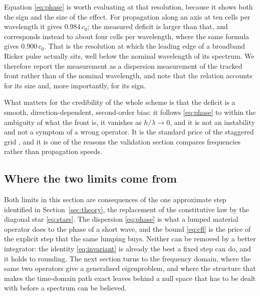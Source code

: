 Equation \eqref{eq:phase} is worth evaluating at that resolution, because it shows both the sign and the size of
the effect. For propagation along an axis at ten cells per wavelength it gives $0.984\,c_0$; the measured deficit
is larger than that, and corresponds instead to about four cells per wavelength, where the same formula gives
$0.900\,c_0$. That is the resolution at which the leading edge of a broadband Ricker pulse actually sits, well
below the nominal wavelength of its spectrum. We therefore report the measurement as a dispersion measurement of
the tracked front rather than of the nominal wavelength, and note that the relation accounts for its size and,
more importantly, for its sign.

What matters for the credibility of the whole scheme is that the deficit is a smooth, direction-dependent,
second-order bias: it follows \eqref{eq:phase} to within the ambiguity of what the front is, it vanishes as
$h/\lambda\to0$, and it is not an instability and not a symptom of a wrong operator. It is the standard price of
the staggered grid \cite{taflove2005}, and it is one of the reasons the validation section compares frequencies
rather than propagation speeds.

\subsection{Where the two limits come from}

Both limits in this section are consequences of the one approximate step identified in
Section~\ref{sec:theory}, the replacement of the constitutive law by the diagonal star \eqref{eq:stars}. The
dispersion \eqref{eq:phase} is what a lumped material operator does to the phase of a short wave, and the bound
\eqref{eq:cfl} is the price of the explicit step that the same lumping buys. Neither can be removed by a better
integrator: the identity \eqref{eq:invariant} is already the best a fixed step can do, and it holds to rounding.
The next section turns to the frequency domain, where the same two operators give a generalised eigenproblem, and
where the structure that makes the time-domain path exact leaves behind a null space that has to be dealt with
before a spectrum can be believed.
